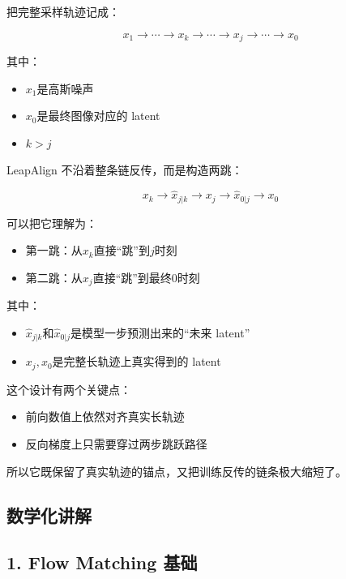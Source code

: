 把完整采样轨迹记成：

\[
x_1 \rightarrow \cdots \rightarrow x_k \rightarrow \cdots \rightarrow x_j \rightarrow \cdots \rightarrow x_0
\]

其中：

\begin{itemize}[leftmargin=1.5em]
  \item $x_1$是高斯噪声
  \item $x_0$是最终图像对应的 latent
  \item $k > j$
\end{itemize}

LeapAlign 不沿着整条链反传，而是构造两跳：

\[
x_k \rightarrow \hat{x}_{j|k} \rightarrow x_j \rightarrow \hat{x}_{0|j} \rightarrow x_0
\]

可以把它理解为：

\begin{itemize}[leftmargin=1.5em]
  \item 第一跳：从$x_k$直接“跳”到$j$时刻
  \item 第二跳：从$x_j$直接“跳”到最终$0$时刻
\end{itemize}

其中：

\begin{itemize}[leftmargin=1.5em]
  \item $\hat{x}_{j|k}$和$\hat{x}_{0|j}$是模型一步预测出来的“未来 latent”
  \item $x_j, x_0$是完整长轨迹上真实得到的 latent
\end{itemize}

这个设计有两个关键点：

\begin{itemize}[leftmargin=1.5em]
  \item 前向数值上依然对齐真实长轨迹
  \item 反向梯度上只需要穿过两步跳跃路径
\end{itemize}

所以它既保留了真实轨迹的锚点，又把训练反传的链条极大缩短了。

\subsection{数学化讲解}

\subsection{1. Flow Matching 基础}


